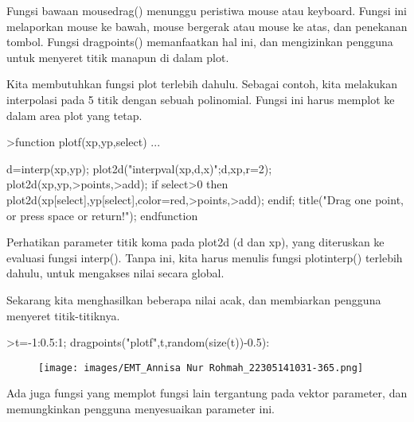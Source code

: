 \documentclass[a4paper,10pt]{article}
\begin{document}
\begin{eulernotebook}
\begin{eulercomment}
Fungsi bawaan mousedrag() menunggu peristiwa mouse atau keyboard.
Fungsi ini melaporkan mouse ke bawah, mouse bergerak atau mouse ke
atas, dan penekanan tombol. Fungsi dragpoints() memanfaatkan hal ini,
dan mengizinkan pengguna untuk menyeret titik manapun di dalam plot.

Kita membutuhkan fungsi plot terlebih dahulu. Sebagai contoh, kita
melakukan interpolasi pada 5 titik dengan sebuah polinomial. Fungsi
ini harus memplot ke dalam area plot yang tetap.
\end{eulercomment}
\begin{eulerprompt}
>function plotf(xp,yp,select) ...
\end{eulerprompt}
\begin{eulerudf}
    d=interp(xp,yp);
    plot2d("interpval(xp,d,x)";d,xp,r=2);
    plot2d(xp,yp,>points,>add);
    if select>0 then
      plot2d(xp[select],yp[select],color=red,>points,>add);
    endif;
    title("Drag one point, or press space or return!");
  endfunction
\end{eulerudf}
\begin{eulercomment}
Perhatikan parameter titik koma pada plot2d (d dan xp), yang
diteruskan ke evaluasi fungsi interp(). Tanpa ini, kita harus menulis
fungsi plotinterp() terlebih dahulu, untuk mengakses nilai secara
global.

Sekarang kita menghasilkan beberapa nilai acak, dan membiarkan
pengguna menyeret titik-titiknya.
\end{eulercomment}
\begin{eulerprompt}
>t=-1:0.5:1; dragpoints("plotf",t,random(size(t))-0.5):
\end{eulerprompt}
\begin{figure}[h]
    \centering
    \texttt{[image: images/EMT\_Annisa Nur Rohmah\_22305141031-365.png]}
\end{figure}
\begin{eulercomment}
Ada juga fungsi yang memplot fungsi lain tergantung pada vektor
parameter, dan memungkinkan pengguna menyesuaikan parameter ini.


\end{eulercomment}
\end{eulernotebook}
\end{document}
